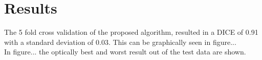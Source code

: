 \section{Results}
The 5 fold cross validation of the proposed algorithm, resulted in a DICE of 0.91 with a standard deviation of 0.03. This can be graphically seen in figure...\\
In figure... the optically best and worst result out of the test data are shown. 
